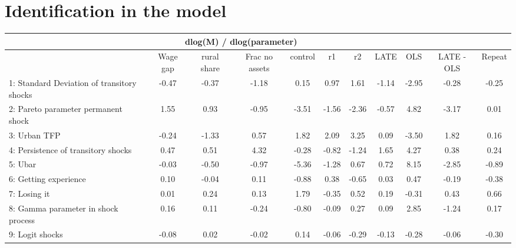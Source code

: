 \documentclass[pdftex,11pt]{article}
\renewcommand{\arraystretch}{.7}
\begin{document}
\section{Identification in the model}


\newpage

\begin{landscape}
\centering
\begin{table}
\footnotesize
\setlength {\tabcolsep}{3.5mm}
\renewcommand{\arraystretch}{2.25}
\begin{center}\label{tb:employment}
\begin{tabular}{l c c c c c c c c c c}
\multicolumn{10}{c}{dlog(M) / dlog(parameter)} \\
\hline
\hline
&  Wage gap & rural share &  Frac no assets & control & r1 & r2 & LATE & OLS & LATE - OLS & Repeat \\
1: Standard Deviation of transitory shocks&    -0.47   & -0.37   &  -1.18  &   0.15  &   0.97 &   1.61  &   -1.14  & -2.95 & -0.28 & -0.25\\
2: Pareto parameter permanent shock       &     1.55   &  0.93   &  -0.95  &  -3.51  &  -1.56 &  -2.36  &   -0.57  &  4.82 & -3.17 &  0.01\\
3: Urban TFP                              &    -0.24   & -1.33   &   0.57  &   1.82  &   2.09 &   3.25  &    0.09  & -3.50 &  1.82 &  0.16\\
4: Persistence of transitory shocks       &     0.47   &  0.51   &   4.32  &  -0.28  &  -0.82 &  -1.24  &    1.65  &  4.27 &  0.38 &  0.24\\
5: Ubar                                   &    -0.03   & -0.50   &  -0.97  &  -5.36  &  -1.28 &   0.67  &    0.72  &  8.15 & -2.85 & -0.89\\
6: Getting experience                     &     0.10   & -0.04   &   0.11  &  -0.88  &   0.38 &  -0.65  &    0.03  &  0.47 & -0.19 & -0.38\\
7: Losing it                              &     0.01   &  0.24   &   0.13  &   1.79  &  -0.35 &   0.52  &    0.19  & -0.31 &  0.43 &  0.66\\
8: Gamma parameter in shock process       &     0.16   &  0.11   &  -0.24  &  -0.80  &  -0.09 &   0.27  &    0.09  &  2.85 & -1.24 &  0.17\\
9: Logit shocks                           &    -0.08   &  0.02   &  -0.02  &   0.14  &  -0.06 &  -0.29  &   -0.13  & -0.28 & -0.06 & -0.30\\
\hline
\hline
\end{tabular}
\end{center}
\end{table}

\end{landscape}
\end{document}

